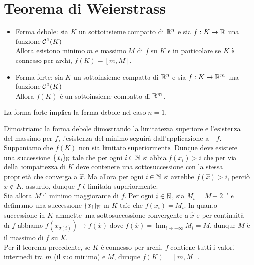 \documentclass[openany]{book}
\begin{document}
\section{Teorema di Weierstrass}

\begin{theorem}{}{}
    \begin{itemize}
        \item Forma debole: sia $K$ un sottoinsieme compatto di $\mathbb{R}^n$ e sia $f : K \to \mathbb{R}$ una funzione $\mathcal{C}^0(K)$.\\
        Allora esistono minimo $m$ e massimo $M$ di $f$ su $K$ e in particolare se $K$ è connesso per archi, $f(K)=[m,M]$.
        \item Forma forte: sia $K$ un sottoinsieme compatto di $\mathbb{R}^n$ e sia $f:K\to\mathbb{R}^m$ una funzione $\mathcal{C}^0(K)$\\
        Allora $f(K)$ è un sottoinsieme compatto di $\mathbb{R}^m$.
    \end{itemize}
    La forma forte implica la forma debole nel caso $n=1$.
\end{theorem}

    Dimostriamo la forma debole dimostrando la limitatezza superiore e l'esistenza del massimo per $f$, l'esistenza del minimo seguirà dall'applicazione a $-f$.\\
    Supponiamo che $f(K)$ non sia limitato superiormente. Dunque deve esistere una successione $\{x_i\}_{\mathbb{N}}$ tale che per ogni $i \in \mathbb{N}$ si abbia $f(x_i)>i$ che per via della compattezza di $K$ deve contenere una sottosuccessione con la stessa proprietà che converga a $\hat{x}$. Ma allora per ogni $i \in \mathbb{N}$ si avrebbe $f(\hat{x})>i$, perciò $\hat{x} \notin K$, assurdo, dunque $f$ è limitata superiormente.\\
    Sia allora $M$ il minimo maggiorante di $f$. Per ogni $i \in \mathbb{N}$, sia $M_i = M - 2^{-i}$ e definiamo una successione $\{x_i\}_{\mathbb{N}}$ in $K$ tale che $f(x_i) = M_i$. In quanto successione in $K$ ammette una sottosuccessione convergente a $\hat{x}$ e per continuità di $f$ abbiamo $f(x_{\sigma(i)})\to f(\hat{x})$ dove $f(\hat{x}) = \lim_{i\to+\infty} M_i = M$, dunque $M$ è il massimo di $f$ su $K$.\\
    Per il teorema precedente, se $K$ è connesso per archi, $f$ contiene tutti i valori intermedi tra $m$ (il suo minimo) e $M$, dunque $f(K) = [m,M]$.
\end{document}
